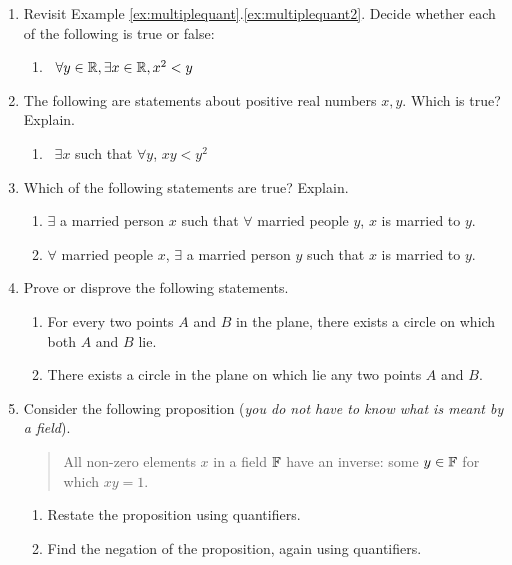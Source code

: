 \begin{exercises}{}{}
\begin{enumerate}
	  
	  \goodbreak
	  
	  
	  \item Revisit Example \ref*{ex:multiplequant}.\ref{ex:multiplequant2}. Decide whether each of the following is true or false:
	  \begin{enumerate}
		  \item {} \ $\forall y\in\mathbb{R},\exists x\in\mathbb{R},x^2<y$
		\end{enumerate}
	
	  
		\item The following are statements about positive real numbers $x,y$. Which is true? Explain.
		\begin{enumerate}
		  \item {} \ $\exists x$ such that $\forall y$, $xy<y^2$
		\end{enumerate}
	
	
		\item Which of the following statements are true? Explain.
		\begin{enumerate}
		  \item $\exists$ a married person $x$ such that $\forall$ married people $y$, $x$ is married to $y$.
		  \item $\forall$ married people $x$, $\exists$ a married person $y$ such that $x$ is married to $y$.
		\end{enumerate}
		
		
		\item Prove or disprove the following statements.
		\begin{enumerate}
		  \item For every two points $A$ and $B$ in the plane, there exists a circle on which both $A$ and $B$ lie.
		  \item There exists a circle in the plane on which lie any two points $A$ and $B$.
		\end{enumerate}
	  
	  
		\item Consider the following proposition (\emph{you do not have to know what is meant by a field}).
		\begin{quote}
			All non-zero elements $x$ in a field $\mathbb{F}$ have an inverse: some $y\in\mathbb{F}$ for which $xy=1$.
		\end{quote}
		\begin{enumerate}
		  \item Restate the proposition using quantifiers.
		  \item Find the negation of the proposition, again using quantifiers.
		\end{enumerate}
			

\end{enumerate}
\end{exercises}
